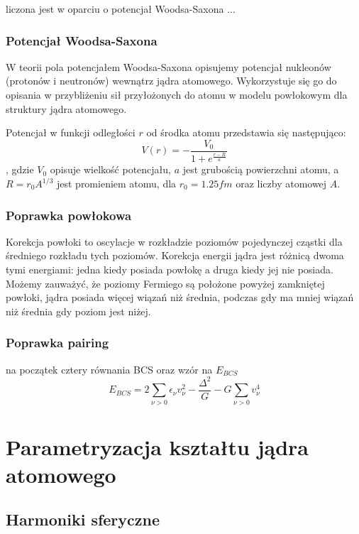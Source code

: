 \documentclass[polish]{article}
\numberwithin{equation}{section}
\begin{document}
liczona jest w oparciu o potencjał Woodsa-Saxona ...

\subsubsection{Potencjał Woodsa-Saxona}

W teorii pola potencjałem Woodsa-Saxona opisujemy potencjał nukleonów (protonów i neutronów) wewnątrz jądra atomowego. Wykorzystuje się go do opisania w przybliżeniu sił przyłożonych do atomu w modelu powłokowym dla struktury jądra atomowego.

Potencjał w funkcji odległości $r$ od środka atomu przedstawia się następująco:
\begin{equation}
V(r)=-\frac{V_{0}}{1+e^{\frac{r-R}{a}}}
\end{equation},
gdzie $V_{0}$ opisuje wielkość potencjału, $a$ jest grubością powierzchni atomu, a $R=r_{0}A^{1/3}$ jest promieniem atomu, dla $r_{0}=1.25 fm$ oraz liczby atomowej $A$. 

\subsubsection{Poprawka powłokowa}
Korekcja powłoki to oscylacje w rozkładzie poziomów pojedynczej cząstki dla średniego rozkładu tych poziomów. Korekcja energii jądra jest różnicą dwoma tymi energiami: jedna kiedy posiada powłokę a druga kiedy jej nie posiada. Możemy zauważyć, że poziomy Fermiego są położone powyżej zamkniętej powłoki, jądra posiada więcej wiązań niż średnia, podczas gdy ma mniej wiązań niż średnia gdy poziom jest niżej. 

\subsubsection{Poprawka pairing}

na początek cztery równania BCS oraz wzór na $E_{BCS}$
\begin{equation}
E_{BCS}=2\sum_{\nu>0}^{}\epsilon_{\nu}v^{2}_{\nu}-\frac{\Delta^{2}}{G}-G\sum_{\nu>0}^{}v^{4}_{\nu}
\end{equation}

\section{Parametryzacja kształtu jądra atomowego}

\subsection{Harmoniki sferyczne}
\end{document}
